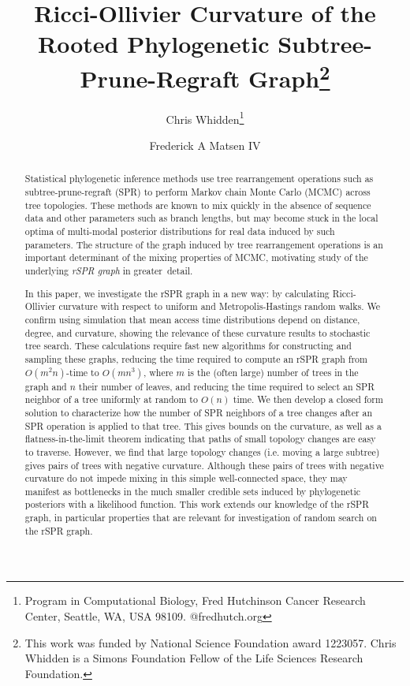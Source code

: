 \documentclass[10pt,twoside,leqno,twocolumn]{article}
\begin{document}
\title{Ricci-Ollivier Curvature of the Rooted Phylogenetic Subtree-Prune-Regraft Graph\thanks{This work was funded by National Science Foundation award 1223057. Chris Whidden is a Simons Foundation Fellow of the Life Sciences Research Foundation.}}

\author{Chris Whidden\thanks{Program in Computational Biology, Fred Hutchinson Cancer Research Center, Seattle, WA, USA 98109. @fredhutch.org} \\
\and
Frederick A Matsen IV\footnotemark[2]}
\date{}

\maketitle

\begin{abstract}
Statistical phylogenetic inference methods use tree rearrangement operations such as subtree-prune-regraft (SPR) to perform Markov chain Monte Carlo (MCMC) across tree topologies.
These methods are known to mix quickly in the absence of sequence data and other parameters such as branch lengths, but may become stuck in the local optima of multi-modal posterior distributions for real data induced by such parameters.
The structure of the graph induced by tree rearrangement operations is an important determinant of the mixing properties of MCMC, motivating study of the underlying \emph{rSPR graph} in greater~detail.

In this paper, we investigate the rSPR graph in a new way: by calculating Ricci-Ollivier curvature with respect to uniform and Metropolis-Hastings random walks.
We confirm using simulation that mean access time distributions depend on distance, degree, and curvature, showing the relevance of these curvature results to stochastic tree search.
These calculations require fast new algorithms for constructing and sampling these graphs, reducing the time required to compute an rSPR graph from $O(m^2n)$-time to $O(mn^3)$, where $m$ is the (often large) number of trees in the graph and $n$ their number of leaves, and reducing the time required to select an SPR neighbor of a tree uniformly at random to $O(n)$ time.
We then develop a closed form solution to characterize how the number of SPR neighbors of a tree changes after an SPR operation is applied to that tree.
This gives bounds on the curvature, as well as a flatness-in-the-limit theorem indicating that paths of small topology changes are easy to traverse.
However, we find that large topology changes (i.e. moving a large subtree) gives pairs of trees with negative curvature.
Although these pairs of trees with negative curvature do not impede mixing in this simple well-connected space, they may manifest as bottlenecks in the much smaller credible sets induced by phylogenetic posteriors with a likelihood function.
This work extends our knowledge of the rSPR graph, in particular properties that are relevant for investigation of random search on the rSPR graph.

\end{abstract}
\end{document}
